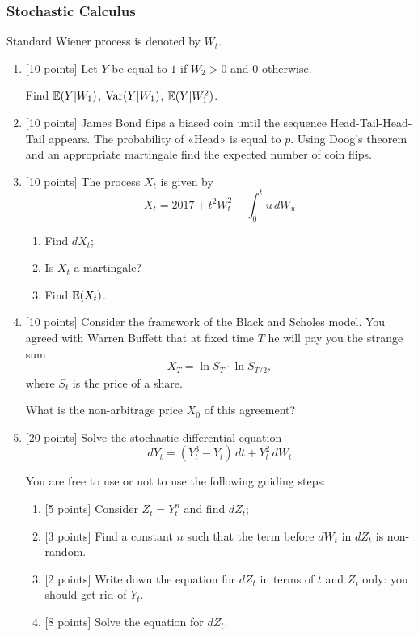 \documentclass[12pt, a4paper]{article}
\begin{document}
\subsubsection{Stochastic Calculus}

Standard Wiener process is denoted by $W_t$.

\begin{enumerate}
  \item {[10 points]} Let $Y$ be equal to $1$ if $W_2>0$ and $0$ otherwise.

  Find $\mathbb{E}(Y|W_1)$, $\operatorname{Var}(Y|W_1)$, $\mathbb{E}(Y|W_1^2)$.
  \item {[10 points]} James Bond flips a biased coin until the sequence Head-Tail-Head-Tail appears. The probability of «Head» is equal to $p$. Using Doog's theorem and an appropriate martingale find the expected number of coin flips.
  \item {[10 points]} The process $X_t$ is given by
  \[
    X_t = 2017 + t^2 W_t^2 + \int_0^t u \, dW_u
  \]
  \begin{enumerate}
    \item Find $dX_t$;
    \item Is $X_t$ a martingale?
    \item Find $\mathbb{E}(X_t)$.
  \end{enumerate}

  \item {[10 points]} Consider the framework of the Black and Scholes model. You agreed with Warren Buffett that at fixed time $T$ he will pay you the strange sum
  \[
  X_T = \ln S_T \cdot \ln S_{T/2},
  \]
where $S_t$ is the price of a share.

What is the non-arbitrage price $X_0$ of this agreement?
  \item {[20 points]} Solve the stochastic differential equation
  \[
  dY_t =(Y_t^3 - Y_t) \, dt + Y_t^2 \, dW_t
  \]

  You are free to use or not to use the following guiding steps:

  \begin{enumerate}
    \item {[5 points]} Consider $Z_t = Y_t^n$ and find $dZ_t$;
    \item {[3 points]} Find a constant $n$ such that the term before $dW_t$ in $dZ_t$ is non-random.
    \item {[2 points]} Write down the equation for $dZ_t$ in terms of $t$ and $Z_t$ only: you should get rid of $Y_t$.
    \item {[8 points]} Solve the equation for $dZ_t$.


\end{enumerate}
\end{enumerate}
\end{document}
